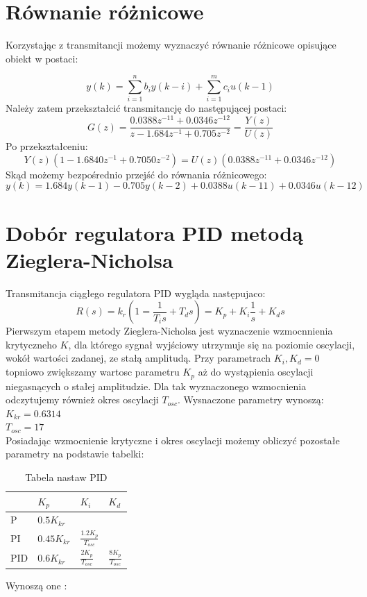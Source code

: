 \documentclass[a4paper, 11pt]{article}
\begin{document}
\section{Równanie różnicowe}
Korzystając z transmitancji możemy wyznaczyć równanie różnicowe opisujące obiekt w postaci: 

$$y(k) = \sum_{i=1}^{n} b_iy(k-i)+ \sum_{i=1}^{m} c_iu(k-1)$$
Należy zatem przekształcić transmitancję do następującej postaci: 
$$G(z) = \frac{0.0388z^{-11}+0.0346z^{-12}}{z-1.684z^{-1}+0.705z^{-2}} = \frac{Y(z)}{U(z)}$$
Po przekształceniu: 
$$Y(z)(1-1.6840z^{-1}+0.7050z^{-2}) = U(z)(0.0388z^{-11}+0.0346z^{-12})$$
Skąd możemy bezpośrednio przejść do równania różnicowego: 
$$y(k) = 1.684y(k-1) - 0.705y(k-2) + 0.0388u(k-11) + 0.0346u(k-12)$$


\section{Dobór regulatora PID metodą Zieglera-Nicholsa}
Transmitancja ciągłego regulatora PID wygląda następujaco: 
$$R(s) = k_r(1=\frac{1}{T_is}+T_ds)=K_p + K_i\frac{1}{s}+K_ds$$
Pierwszym etapem metody Zieglera-Nicholsa jest wyznaczenie wzmocnnienia krytyczneho $K$, dla którego sygnał wyjściowy utrzymuje się na poziomie oscylacji, wokół wartości zadanej, ze stałą amplitudą. Przy parametrach $K_i, K_d=0$ topniowo zwiększamy wartosc parametru $K_p$ aż do wystąpienia oscylacji niegasnących o stałej amplitudzie. Dla tak wyznaczonego wzmocnienia odczytujemy również okres oscylacji $T_{osc}$. Wysnaczone parametry wynoszą: \\

$K_{kr} = 0.6314$\\
\indent $T_{osc} = 17$\\

Posiadając wzmocnienie krytyczne i okres oscylacji możemy obliczyć pozostałe parametry na podstawie tabelki: 
\begin{table}[htp]
\centering
\caption{Tabela nastaw PID}
\label{my-label}
\begin{tabular}{|l|l|l|l|}
\hline
    & $K_p$       & $K_i $                & $K_d $              \\
\hline
P   & $0.5K_{kr} $ &                    &                   \\
\hline
PI   & $0.45K_{kr}$ & $\frac{1.2K_p}{T_{osc}}$ &                   \\
\hline
PID & $0.6K_{kr} $ & $\frac{2K_p}{T_{osc}}$   & $\frac{8K_p}{T_{osc}}$ \\
\hline
\end{tabular}
\end{table}
Wynoszą one :\\
\end{document}
